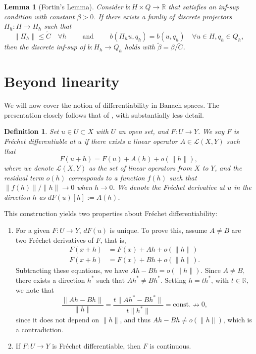 \documentclass{article}
\newtheorem{definition}{Definition}
\newcommand{\R}{\mathbb{R}}
\newtheorem{lemma}{Lemma}
\begin{document}
\begin{lemma}[Fortin's Lemma]
Consider $b:H\times Q\to \R$ that satisfies an inf-sup condition with constant $\beta >0$. If there exists a famliy of discrete projectors $\Pi_h: H\to H_h$ such that 
    \[ \|\Pi_h \|\leq \tilde C \quad \forall h \qquad \text{ and } \qquad b(\Pi_h u, q_h) = b(u, q_h) \quad\forall u\in H, q_h \in Q_h,\]
then the discrete inf-sup of $b:H_h\to Q_h$ holds with $\tilde \beta = \beta / \tilde C$.
\end{lemma}

\section{Beyond linearity}
We will now cover the notion of differentiability in Banach spaces. The presentation closely follows that of \cite{ambrosetti1995primer}, with substantially less detail.
\begin{definition}
    Set $u\in U \subset X$ with $U$ an open set, and $F:U\to Y$. We say $F$ is Fréchet differentiable at $u$ if there exists a linear operator $A\in\mathcal{L}(X,Y)$ such that
    \begin{equation*}
        F(u+h)=F(u)+A(h)+o(\|h\|),
    \end{equation*}
    where we denote $\mathcal{L}(X,Y)$ as the set of linear operators from $X$ to $Y$, and the residual term $o(h)$ corresponds to a function $f(h)$ such that $\|f(h)\|/\|h\| \to 0$ when $h\to 0$. We denote the Fréchet derivative at $u$ in the direction $h$ as $dF(u)[h] := A(h)$.
\end{definition}
This construction yields two properties about Fréchet differentiability:
\begin{enumerate}
    \item For a given $F:U\to Y$, $dF(u)$ is unique. To prove this, assume $A\neq B$ are two Fréchet derivatives of $F$, that is, 
    \begin{align*}
        F(x+h) &= F(x) + Ah + o(\|h\|) \\
        F(x+h) &= F(x) + Bh + o(\|h\|).
    \end{align*}
    Subtracting these equations, we have $Ah - Bh = o(\|h\|)$. Since $A\neq B$, there exists a direction $h^*$ such that $Ah^* \neq Bh^*$. Setting $h=th^*$, with $t\in \mathbb{R}$, we note that
    \begin{equation*}
        \frac{\|Ah-Bh\|}{\|h\|} = \frac{t\|Ah^*-Bh^*\|}{t\|h^*\|} = \text{const.} \nrightarrow 0,
    \end{equation*}
    since it does not depend on $\|h\|$, and thus $Ah - Bh \neq o(\|h\|)$, which is a contradiction. 
    \item If $F:U\to Y$ is Fréchet differentiable, then $F$ is continuous.
\end{enumerate}
\end{document}
